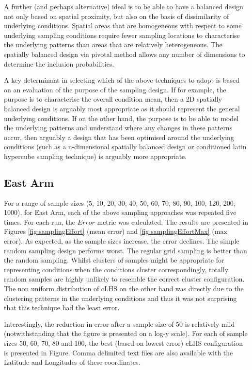 \documentclass[a4paper]{article}
\begin{document}
A further (and perhaps alternative) ideal is to be able to have a
balanced design not only based on spatial proximity, but also on the
basis of dissimilarity of underlying conditions. Spatial areas that are
homogeneous with respect to some underlying sampling conditions require
fewer sampling locations to characterise the underlying patterns than
areas that are relatively heterogeneous. The spatially balanced design
via pivotal method allows any number of dimensions to determine the
inclusion probabilities.

A key determinant in selecting which of the above techniques to adopt is
based on an evaluation of the purpose of the sampling design. If for
example, the purpose is to characterise the overall condition mean, then
a 2D spatially balanced design is arguably most appropriate as it should
represent the general underlying conditions. If on the other hand, the
purpose is to be able to model the underlying patterns and understand
where any changes in these patterns occur, then arguably a design that
has been optimised around the underlying conditions (such as a
n-dimensional spatially balanced design or conditioned latin hypercube
sampling technique) is arguably more appropriate.

\hypertarget{east-arm}{%
\subsection{East Arm}\label{east-arm}}

For a range of sample sizes (5, 10, 20, 30, 40, 50, 60, 70, 80, 90, 100,
120, 200, 1000), for East Arm, each of the above sampling approaches was
repeated five times. For each run, the \(Error\) metric was calculated.
The results are presented in Figures \ref{fig:samplingEffort} (mean
error) and \ref{fig:samplingEffortMax} (max error). As expected, as the
sample sizes increase, the error declines. The simple random sampling
design performs worst. The regular grid sampling is better than the
random sampling. Whilst clusters of samples might be appropriate for
representing conditions when the conditions cluster correspondingly,
totally random samples are highly unlikely to resemble the correct
cluster configuration. The non uniform distribution of cLHS on the other
hand was directly due to the clustering patterns in the underlying
conditions and thus it was not surprising that this technique had the
least error.

Interestingly, the reduction in error after a sample size of 50 is
relatively mild (notwithstanding that the figure is presented on a log-y
scale). For each of sample sizes 50, 60, 70, 80 and 100, the best (based
on lowest error) cLHS configuration is presented in Figure. Comma
delimited text files are also available with the Latitude and Longitudes
of these coordinates.
\end{document}
